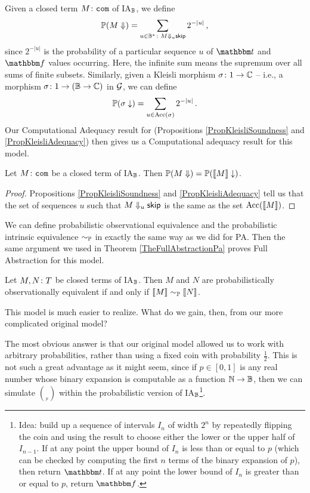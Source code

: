 Given a closed term $M\colon{\mathtt{com}}$ of IA${}_{\mathbb{B}}$, we define
\[
  \mathbb{P}(M\Downarrow) = \sum_{u\in\mathbb{B}^*\colon M\Downarrow_u{\mathsf{skip}}} 2^{-|u|}\,,
  \]
since $2^{-|u|}$ is the probability of a particular sequence $u$ of $\true$ and $\false$ values occurring.
Here, the infinite sum means the supremum over all sums of finite subsets.
Similarly, given a Kleisli morphism $\sigma\colon 1 \to \mathbb{C}$ -- i.e., a morphism $\sigma\colon 1 \to (\mathbb{B} \to \mathbb{C})$ in $\mathcal G$, we can define
\[
  \mathbb{P}(\sigma\downarrow) = \sum_{u\in\operatorname{Acc}(\sigma)} 2^{-|u|}\,.
  \]
Our Computational Adequacy result for \IAX (Propositions \ref{PropKleisliSoundness} and \ref{PropKleisliAdequacy}) then gives us a Computational adequacy result for this model.

\begin{proposition}
  Let $M\colon {\mathtt{com}}$ be a closed term of IA${}_{\mathbb{B}}$.  
  Then $\mathbb{P}(M\Downarrow) = \mathbb{P}(\left\llbracket M\right\rrbracket\downarrow)$.
\end{proposition}
\begin{proof}
  Propositions \ref{PropKleisliSoundness} and \ref{PropKleisliAdequacy} tell us that the set of sequences $u$ such that $M\Downarrow_u{\mathsf{skip}}$ is the same as the set $\operatorname{Acc}(\left\llbracket M\right\rrbracket)$.
\end{proof}

We can define probabilistic observational equivalence and the probabilistic intrinsic equivalence $\sim_{\mathbb{P}}$ in exactly the same way as we did for PA.  
Then the same argument we used in Theorem \ref{TheFullAbstractionPa} proves Full Abstraction for this model.

\begin{theorem}
  Let $M,N\colon T$ be closed terms of IA${}_{\mathbb{B}}$.  
  Then $M$ and $N$ are probabilistically observationally equivalent if and only if $\left\llbracket M\right\rrbracket\sim_{\mathbb{P}}\left\llbracket N\right\rrbracket$.
\end{theorem}

This model is much easier to realize.  
What do we gain, then, from our more complicated original model?  

The most obvious answer is that our original model allowed us to work with arbitrary probabilities, rather than using a fixed coin with probability $\frac12$.  
This is not such a great advantage as it might seem, since if $p\in[0,1]$ is any real number whose binary expansion is computable as a function $\mathbb{N} \to \mathbb{B}$, then we can simulate $\choose_p$ within the probabilistic version of IA${}_{\mathbb{B}}$\footnote{Idea: build up a sequence of intervals $I_n$ of width $2^n$ by repeatedly flipping the coin and using the result to choose either the lower or the upper half of $I_{n-1}$.  
If at any point the upper bound of $I_n$ is less than or equal to $p$ (which can be checked by computing the first $n$ terms of the binary expansion of $p$), then return $\true$.  
If at any point the lower bound of $I_n$ is greater than or equal to $p$, return $\false$.}.

